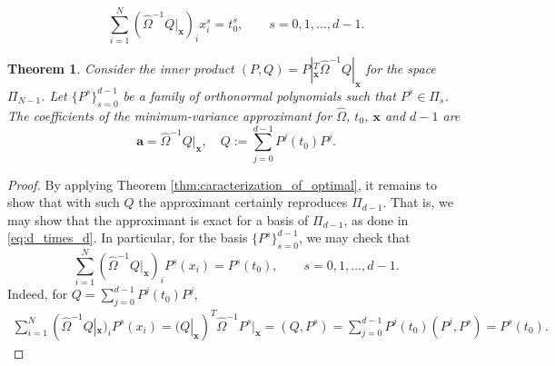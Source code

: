\documentclass[10pt,a4paper]{amsart}
\newtheorem{thm}{Theorem}
\newcommand{\ba}{\bm{a}}
\newcommand{\bx}{\bm{x}}
\begin{document}
\begin{equation} \label{eq:d_times_d}
    \sum_{i=1}^{N} (\hat \Omega^{-1} Q|_{\bx})_i x_i^s = t_0^s, \qquad s = 0,1,\ldots,d-1.
\end{equation}

\begin{thm}\label{thm:orthonormal}
    Consider the inner product $(P,Q) = P|_{\bx}^T \hat\Omega^{-1} Q|_{\bx}$ for the space $\Pi_{N-1}$.
    Let $\{P^s\}_{s=0}^{d-1}$ be a family of orthonormal polynomials such that $P^s\in\Pi_s$. The coefficients of the minimum-variance approximant for $\hat\Omega$, $t_0$, $\bx$ and $d-1$ are
    \[
        \ba = \hat\Omega^{-1} Q|_{\bx}, \quad Q:=\sum_{j=0}^{d-1} P^j(t_0) P^j.
    \]
\end{thm}

\begin{proof}
    By applying Theorem \ref{thm:caracterization_of_optimal}, it remains to show that with such $Q$ the approximant certainly reproduces $\Pi_{d-1}$. That is, we may show that the approximant is exact for a basis of $\Pi_{d-1}$, as done in \eqref{eq:d_times_d}. In particular, for the basis $\{P^s\}_{s=0}^{d-1}$, we may check that
    \[
    \sum_{i=1}^{N} (\hat \Omega^{-1} Q|_{\bx})_i P^s(x_i) = P^s(t_0), \qquad s = 0,1,\ldots,d-1.
    \]
    Indeed, for $Q=\sum_{j=0}^{d-1} P^j(t_0) P^j$,
    \begin{align*}
        \sum_{i=1}^{N} (\hat \Omega^{-1} Q|_{\bx})_i P^s(x_i)
        = (Q|_{\bx})^T \hat \Omega^{-1} P^s|_{\bx}
        = \left(Q,P^s\right)
        = \sum_{j=0}^{d-1} P^j(t_0) \left(P^j,P^s\right)
        = P^s(t_0).
    \end{align*}
\end{proof}
\end{document}
